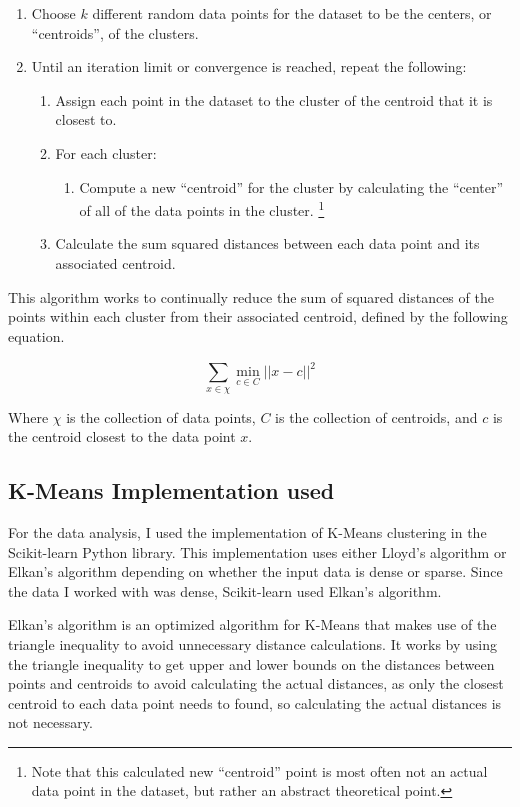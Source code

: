 \documentclass[]{article}
\begin{document}
\begin{enumerate}
	\item Choose $k$ different random data points for the dataset to be the centers, or ``centroids'', of the clusters.
	\item Until an iteration limit or convergence is reached, repeat the following:
	\begin{enumerate}
		\item Assign each point in the dataset to the cluster of the centroid that it is closest to.
		\item For each cluster:
		\begin{enumerate}
			\item Compute a new ``centroid'' for the cluster by calculating the ``center'' of all of the data points in the cluster. \footnote{Note that this calculated new ``centroid'' point is most often not an actual data point in the dataset, but rather an abstract theoretical point.}
		\end{enumerate}
		\item Calculate the sum squared distances between each data point and its associated centroid.
	\end{enumerate}
\end{enumerate}

This algorithm works to continually reduce the sum of squared distances of the points within each cluster from their associated centroid, defined by the following equation. \cite{arthur_2007}

$$
\sum_{x \in \chi}^{}\min_{c \in C} || x - c ||^2
$$

Where $\chi$ is the collection of data points, $C$ is the collection of centroids, and $c$ is the centroid closest to the data point $x$.

\subsection{K-Means Implementation used}
For the data analysis, I used the implementation of K-Means clustering in the Scikit-learn Python library. \cite{pedregosa_2011} This implementation uses either Lloyd’s algorithm or Elkan’s algorithm depending on whether the input data is dense or sparse. \cite{scikit_learn_kmeans} Since the data I worked with was dense, Scikit-learn used Elkan’s algorithm.

Elkan’s algorithm is an optimized algorithm for K-Means that makes use of the triangle inequality to avoid unnecessary distance calculations. It works by using the triangle inequality to get upper and lower bounds on the distances between points and centroids to avoid calculating the actual distances, as only the closest centroid to each data point needs to found, so calculating the actual distances is not necessary. \cite{elkan_2003}
\end{document}
